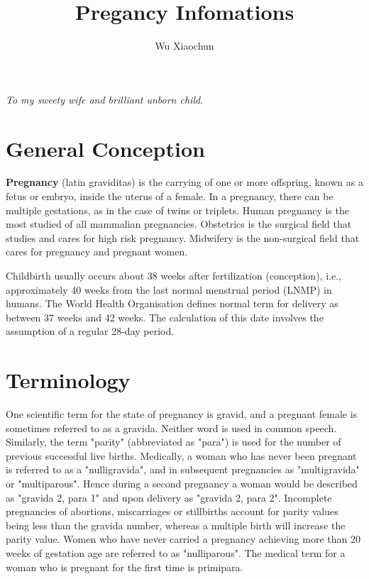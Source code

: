 \documentclass[12pt,a4paper,onecolumn]{article}
\title{{\large Pregancy Infomations}}
\author{{\small \textsf{Wu Xiaochun}}}
\date{}
\begin{document}
\maketitle
\thispagestyle{empty}
\pagebreak

\thispagestyle{empty}
\vfill
\vfill

\begin{center}
{\large {\it To my sweety wife and brilliant unborn child.}}
\end{center}
\vfill
\pagebreak

\setcounter{page}{1}
\pagestyle{plain}
\tableofcontents
\pagebreak
\listoffigures
\pagebreak
\setcounter{page}{1}
\pagestyle{fancy}
\section{General Conception}

\begin{figwindow}
  \textbf{Pregnancy} (latin graviditas) is the carrying of one or more offspring, known as a fetus
  or embryo, inside the uterus of a female. In a pregnancy, there can be multiple gestations, as in
  the case of twins or triplets. Human pregnancy is the most studied of all mammalian pregnancies.
  Obstetrics is the surgical field that studies and cares for high risk pregnancy. Midwifery is the
  non-surgical field that cares for pregnancy and pregnant women.


Childbirth usually occurs about 38 weeks after fertilization (conception), i.e., approximately 40
weeks from the last normal menstrual period (LNMP) in humans. The World Health Organisation defines
normal term for delivery as between 37 weeks and 42 weeks. The calculation of this date involves the
assumption of a regular 28-day period.

\end{figwindow}

\section{Terminology}

One scientific term for the state of pregnancy is gravid, and a pregnant female is sometimes
referred to as a gravida. Neither word is used in common speech. Similarly, the term "parity"
(abbreviated as "para") is used for the number of previous successful live births. Medically, a
woman who has never been pregnant is referred to as a "nulligravida", and in subsequent pregnancies
as "multigravida" or "multiparous". Hence during a second pregnancy a woman would be described as
"gravida 2, para 1" and upon delivery as "gravida 2, para 2". Incomplete pregnancies of abortions,
miscarriages or stillbirths account for parity values being less than the gravida number, whereas a
multiple birth will increase the parity value. Women who have never carried a pregnancy achieving
more than 20 weeks of gestation age are referred to as "nulliparous". The medical term for a woman
who is pregnant for the first time is primipara.
\end{document}
